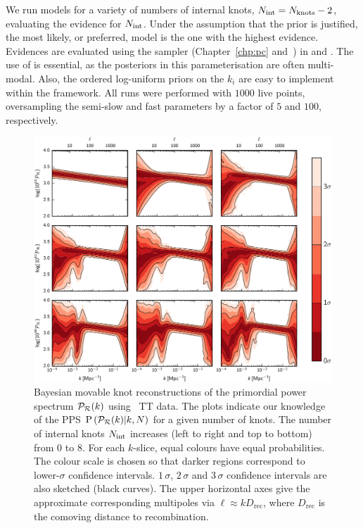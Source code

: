 We run models for a variety of numbers of internal knots, \(N_\mathrm{int} =N_\mathrm{knots} -2\), evaluating the evidence for \(N_\mathrm{int}\).  Under the assumption that the prior is justified, the most likely, or preferred, model is the one with the highest evidence.  Evidences are evaluated using the \PolyChord{} sampler (Chapter~\ref{chp:pc} and~\citealp{polychordletter,polychordpaper}) in \CAMB{} and \CosmoMC{}. The use of \PolyChord{} is essential, as the posteriors in this parameterisation are often multi-modal. Also, the ordered log-uniform priors on the \(k_i\) are easy to implement within the \PolyChord{} framework. All runs were performed with \(1000\) live points, oversampling the semi-slow and fast parameters by a factor of \(5\) and \(100\), respectively.

\begin{figure}[tp]
  \includegraphics[width=\textwidth]{chapters/pps_reconstruction/figures/array}
  \caption{Bayesian movable knot reconstructions of the primordial power spectrum \(\mathcal{P}_{\mathcal{R}}(k)\) using \Planck\ TT data.  The plots indicate our knowledge of the PPS \(\mathrm{P}\left(\mathcal{P}_{\mathcal{R}}(k)\middle|k,N\right)\) for a given number of knots.  The number of internal knots \(N_\mathrm{int}\) increases (left to right and top to bottom) from \(0\) to \(8\).  For each \(k\)-slice, equal colours have equal probabilities. The colour scale is chosen so that darker regions correspond to lower-\(\sigma\) confidence intervals.  \(1\,\sigma\), \(2\,\sigma \) and \(3\,\sigma \) confidence intervals are also sketched (black curves).  The upper horizontal axes give the approximate corresponding multipoles via \(\ell \approx kD_\mathrm{rec}\), where \(D_\mathrm{rec}\) is the comoving distance to recombination.}\label{fig:Pkr0}
\end{figure}


